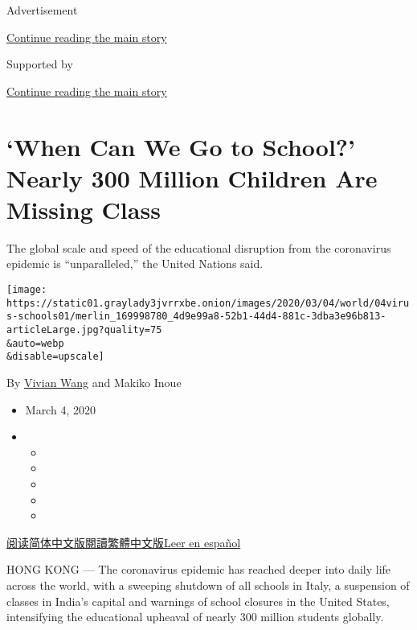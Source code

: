 Advertisement

\protect\hyperlink{after-top}{Continue reading the main story}

Supported by

\protect\hyperlink{after-sponsor}{Continue reading the main story}

\hypertarget{when-can-we-go-to-school-nearly-300-million-children-are-missing-class}{%
\section{`When Can We Go to School?' Nearly 300 Million Children Are
Missing
Class}\label{when-can-we-go-to-school-nearly-300-million-children-are-missing-class}}

The global scale and speed of the educational disruption from the
coronavirus epidemic is ``unparalleled,'' the United Nations said.

\texttt{[image: https://static01.graylady3jvrrxbe.onion/images/2020/03/04/world/04virus-schools01/merlin\_169998780\_4d9e99a8-52b1-44d4-881c-3dba3e96b813-articleLarge.jpg?quality=75\\\&auto=webp\\\&disable=upscale]}

By \href{https://www.nytimes3xbfgragh.onion/by/vivian-wang}{Vivian Wang}
and Makiko Inoue

\begin{itemize}
\item
  March 4, 2020
\item
  \begin{itemize}
  \item
  \item
  \item
  \item
  \item
  \end{itemize}
\end{itemize}

\href{https://cn.nytimes3xbfgragh.onion/education/20200305/coronavirus-schools-closed/}{阅读简体中文版}\href{https://cn.nytimes3xbfgragh.onion/education/20200305/coronavirus-schools-closed/zh-hant/}{閱讀繁體中文版}\href{https://www.nytimes3xbfgragh.onion/es/2020/03/05/espanol/mundo/suspension-clases-coronavirus.html}{Leer
en español}

HONG KONG --- The coronavirus epidemic has reached deeper into daily
life across the world, with a sweeping shutdown of all schools in Italy,
a suspension of classes in India's capital and warnings of school
closures in the United States, intensifying the educational upheaval of
nearly 300 million students globally.

